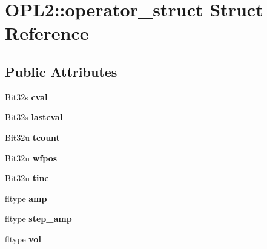 \hypertarget{structOPL2_1_1operator__struct}{\section{O\-P\-L2\-:\-:operator\-\_\-struct Struct Reference}
\label{structOPL2_1_1operator__struct}
}
\subsection*{Public Attributes}
\begin{DoxyCompactItemize}
\item 
\hypertarget{structOPL2_1_1operator__struct_abc91b7102f609e3af25cd2b09f797d61}{Bit32s {\bfseries cval}}\label{structOPL2_1_1operator__struct_abc91b7102f609e3af25cd2b09f797d61}

\item 
\hypertarget{structOPL2_1_1operator__struct_a9de2bf1c6381264fade36021e44aa228}{Bit32s {\bfseries lastcval}}\label{structOPL2_1_1operator__struct_a9de2bf1c6381264fade36021e44aa228}

\item 
\hypertarget{structOPL2_1_1operator__struct_a6cf578fdd7cddb13788d42a9b980a40c}{Bit32u {\bfseries tcount}}\label{structOPL2_1_1operator__struct_a6cf578fdd7cddb13788d42a9b980a40c}

\item 
\hypertarget{structOPL2_1_1operator__struct_a5ac3352149c361f9f03301daf65e2e43}{Bit32u {\bfseries wfpos}}\label{structOPL2_1_1operator__struct_a5ac3352149c361f9f03301daf65e2e43}

\item 
\hypertarget{structOPL2_1_1operator__struct_a7e7e2c73aab0d570061470760913e2d7}{Bit32u {\bfseries tinc}}\label{structOPL2_1_1operator__struct_a7e7e2c73aab0d570061470760913e2d7}

\item 
\hypertarget{structOPL2_1_1operator__struct_a4a17dc8faa8d90516ca9fbea80299cde}{fltype {\bfseries amp}}\label{structOPL2_1_1operator__struct_a4a17dc8faa8d90516ca9fbea80299cde}

\item 
\hypertarget{structOPL2_1_1operator__struct_a100ab7526371bad9dd64511d75a64661}{fltype {\bfseries step\-\_\-amp}}\label{structOPL2_1_1operator__struct_a100ab7526371bad9dd64511d75a64661}

\item 
\hypertarget{structOPL2_1_1operator__struct_a59c344b9e27ece6c35e41ee86c0c0637}{fltype {\bfseries vol}}\label{structOPL2_1_1operator__struct_a59c344b9e27ece6c35e41ee86c0c0637}


\end{DoxyCompactItemize}
